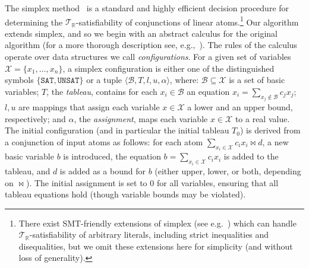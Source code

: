 \documentclass[a4paper]{llncs}
\newcommand{\basic}{\mathcal{B}}
\newcommand{\allvars}{\mathcal{X}}
\newcommand{\ub}{u}
\newcommand{\lb}{l}
\newcommand{\assignment}{\alpha{}}
\newcommand{\tr}{\mathcal{T}_{\mathbb{R}}}
\newcommand{\sat}{\texttt{SAT}}
\newcommand{\unsat}{\texttt{UNSAT}}
\begin{document}
The simplex method~\cite{Dantzig1963} is a standard and highly efficient
decision procedure for determining the $\tr{}$-satisfiability of conjunctions of linear
atoms.\footnote{There exist SMT-friendly extensions of simplex (see e.g.~\cite{Ki14}) which can handle
$\tr{}$-satisfiability of arbitrary literals, including strict inequalities and
disequalities, but we omit these extensions here for simplicity (and without loss of generality).}
Our
algorithm extends simplex, and so we begin with an abstract
calculus for the original algorithm (for a more thorough description see,
e.g.,~\cite{Va96}).
The rules of the calculus operate over data structures we call
\emph{configurations}.  For a given set of variables $\allvars = \{x_1,\ldots,x_n\}$,
a simplex configuration is either one of the distinguished symbols
$\{\sat{},\unsat{}\}$ or a tuple $\langle \basic, T, \lb,
\ub, \assignment\rangle$, where:
$\basic\subseteq \allvars$ is a set of basic variables;
$T$, the \emph{tableau}, contains for each $x_i\in\basic$
an equation $x_i =
  \sum_{x_j\notin\basic} c_j x_j$;
  $\lb, \ub$ are mappings that assign each
  variable $x\in\allvars$ a lower and an upper bound, respectively; and
  $\assignment$, the \emph{assignment}, maps each variable $x\in\allvars$
  to a real value. The initial configuration (and in particular the initial tableau
  $T_0$) is derived from a conjunction of input atoms as follows: for each atom $\sum_{x_i\in
  \allvars}c_ix_i\bowtie d$, a new basic variable $b$ is introduced, the
  equation $b=\sum_{x_i\in \allvars}c_ix_i$ is added to the tableau, and $d$ is
  added as a bound for $b$ (either upper, lower, or both, depending on
  $\bowtie$).  
  The initial assignment is set to $0$ for all variables, ensuring that all
  tableau equations hold (though variable bounds may be violated).
\end{document}
